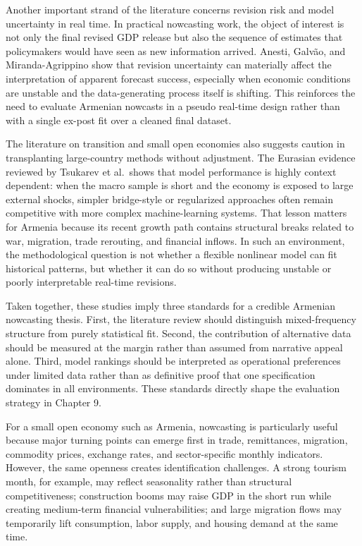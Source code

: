 \documentclass[12pt,a4paper]{report}
\begin{document}
Another important strand of the literature concerns revision risk and model uncertainty in real time. In practical nowcasting work, the object of interest is not only the final revised GDP release but also the sequence of estimates that policymakers would have seen as new information arrived. Anesti, Galv\~{a}o, and Miranda-Agrippino show that revision uncertainty can materially affect the interpretation of apparent forecast success, especially when economic conditions are unstable and the data-generating process itself is shifting.\citep{Anesti2020} This reinforces the need to evaluate Armenian nowcasts in a pseudo real-time design rather than with a single ex-post fit over a cleaned final dataset.

The literature on transition and small open economies also suggests caution in transplanting large-country methods without adjustment. The Eurasian evidence reviewed by Tsukarev et al.\ shows that model performance is highly context dependent: when the macro sample is short and the economy is exposed to large external shocks, simpler bridge-style or regularized approaches often remain competitive with more complex machine-learning systems.\citep{ArmeniaBelarus2024} That lesson matters for Armenia because its recent growth path contains structural breaks related to war, migration, trade rerouting, and financial inflows. In such an environment, the methodological question is not whether a flexible nonlinear model can fit historical patterns, but whether it can do so without producing unstable or poorly interpretable real-time revisions.

Taken together, these studies imply three standards for a credible Armenian nowcasting thesis. First, the literature review should distinguish mixed-frequency structure from purely statistical fit. Second, the contribution of alternative data should be measured at the margin rather than assumed from narrative appeal alone. Third, model rankings should be interpreted as operational preferences under limited data rather than as definitive proof that one specification dominates in all environments. These standards directly shape the evaluation strategy in Chapter 9.

For a small open economy such as Armenia, nowcasting is particularly useful because major turning points can emerge first in trade, remittances, migration, commodity prices, exchange rates, and sector-specific monthly indicators. However, the same openness creates identification challenges. A strong tourism month, for example, may reflect seasonality rather than structural competitiveness; construction booms may raise GDP in the short run while creating medium-term financial vulnerabilities; and large migration flows may temporarily lift consumption, labor supply, and housing demand at the same time.
\end{document}
